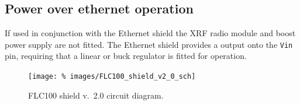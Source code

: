 \subsection{Power over ethernet operation}
If used in conjunction with the Ethernet shield the
XRF radio module and boost power supply are not fitted. The Ethernet
shield provides a  output onto the \texttt{Vin} pin,
requiring that a linear or buck regulator is fitted for  operation.


\begin{landscape}
  \begin{figure}[p]
    \centering
    \texttt{[image: \%
      images/FLC100\_shield\_v2\_0\_sch]}
    \caption{FLC100 shield v.~2.0 circuit diagram.}
    \label{fig:flc100-shield-v2.0-cct-diag}
  \end{figure}
\end{landscape}
